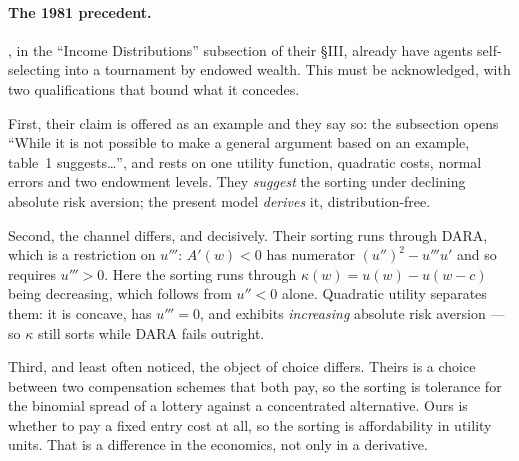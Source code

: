 \documentclass[11pt,a4paper]{article}
\begin{document}
\paragraph{The 1981 precedent.} \citet{LazearRosen1981}, in the ``Income
Distributions'' subsection of their \S III, already have agents self-selecting
into a tournament by endowed wealth. This must be acknowledged, with two
qualifications that bound what it concedes.

First, their claim is offered as an example and they say so: the subsection
opens ``While it is not possible to make a general argument based on an
example, table~1 suggests\ldots'', and rests on one utility function, quadratic
costs, normal errors and two endowment levels. They \emph{suggest} the sorting
under declining absolute risk aversion; the present model \emph{derives} it,
distribution-free.

Second, the channel differs, and decisively. Their sorting runs through DARA,
which is a restriction on $u'''$: $A'(w)<0$ has numerator $(u'')^2 - u'''u'$
and so requires $u'''>0$. Here the sorting runs through $\kappa(w) =
u(w)-u(w-c)$ being decreasing, which follows from $u''<0$ alone. Quadratic
utility separates them: it is concave, has $u'''=0$, and exhibits
\emph{increasing} absolute risk aversion --- so $\kappa$ still sorts while DARA
fails outright.

Third, and least often noticed, the object of choice differs. Theirs is a
choice between two compensation schemes that both pay, so the sorting is
tolerance for the binomial spread of a lottery against a concentrated
alternative. Ours is whether to pay a fixed entry cost at all, so the sorting
is affordability in utility units. That is a difference in the economics, not
only in a derivative.
\end{document}
